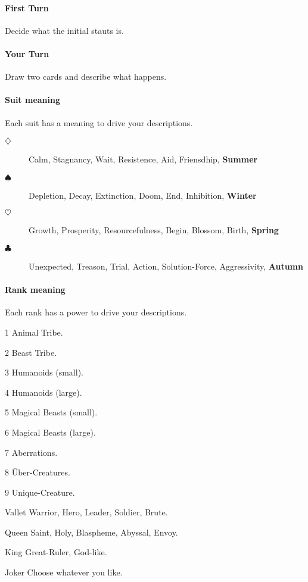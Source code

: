 \documentclass[10pt,a4paper]{report}
\begin{document}
\paragraph{First Turn} Decide what the initial stauts is.

\paragraph{Your Turn}
Draw two cards and describe what happens.

\paragraph{Suit meaning}
Each suit has a meaning to drive your descriptions.
\begin{description}
\item[$\diamondsuit$] Calm, Stagnancy, Wait, Resistence, Aid, Friensdhip, \textbf{Summer}
\item[$\spadesuit$] Depletion, Decay, Extinction, Doom, End, Inhibition, \textbf{Winter}
\item[$\heartsuit$] Growth, Prosperity, Resourcefulness, Begin, Blossom, Birth, \textbf{Spring}
\item[$\clubsuit$] Unexpected, Treason, Trial, Action, Solution-Force, Aggressivity, \textbf{Autumn}
\end{description}

\paragraph{Rank meaning}
Each rank has a power to drive your descriptions.

\begin{description}
\item 1 Animal Tribe.
\item 2 Beast Tribe.
\item 3 Humanoids (small).
\item 4 Humanoids (large).
\item 5 Magical Beasts (small).
\item 6 Magical Beasts (large).
\item 7 Aberrations.
\item 8 \"{U}ber-Creatures.
\item 9 Unique-Creature.
\item Vallet Warrior, Hero, Leader, Soldier, Brute.
\item Queen Saint, Holy, Blaspheme, Abyssal, Envoy.
\item King Great-Ruler, God-like.
\item Joker Choose whatever you like.
\end{description}
\end{document}
